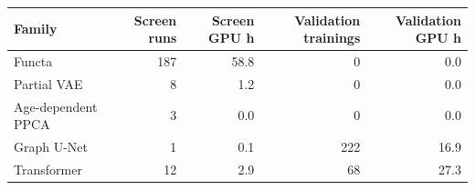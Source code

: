 \begin{tabular}{lrrrr}
\toprule
Family & Screen runs & Screen GPU h & Validation trainings & Validation GPU h \\
\midrule
Functa & 187 & 58.8 & 0 & 0.0 \\
Partial VAE & 8 & 1.2 & 0 & 0.0 \\
Age-dependent PPCA & 3 & 0.0 & 0 & 0.0 \\
Graph U-Net & 1 & 0.1 & 222 & 16.9 \\
Transformer & 12 & 2.9 & 68 & 27.3 \\
\bottomrule
\end{tabular}
